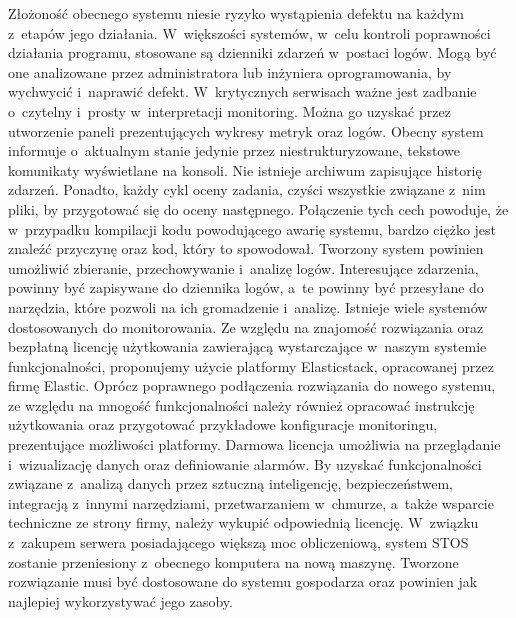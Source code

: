 \newline \indent Złożoność obecnego systemu niesie ryzyko wystąpienia defektu na każdym z~etapów jego działania. W~większości systemów, w~celu kontroli poprawności działania programu, stosowane są dzienniki zdarzeń w~postaci logów. Mogą być one analizowane przez administratora lub inżyniera oprogramowania, by wychwycić i~naprawić defekt. W~krytycznych serwisach ważne jest zadbanie o~czytelny i~prosty w~interpretacji monitoring. Można go uzyskać przez utworzenie paneli prezentujących wykresy metryk oraz logów. Obecny system informuje o~aktualnym stanie jedynie przez niestrukturyzowane, tekstowe komunikaty wyświetlane na konsoli. Nie istnieje archiwum zapisujące historię zdarzeń. Ponadto, każdy cykl oceny zadania, czyści wszystkie związane z~nim pliki, by przygotować się do oceny następnego. Połączenie tych cech powoduje, że w~przypadku kompilacji kodu powodującego awarię systemu, bardzo ciężko jest znaleźć przyczynę oraz kod, który to spowodował. Tworzony system powinien umożliwić zbieranie, przechowywanie i~analizę logów. Interesujące zdarzenia, powinny być zapisywane do dziennika logów, a~te powinny być przesyłane do narzędzia, które pozwoli na ich gromadzenie i~analizę. Istnieje wiele systemów dostosowanych do monitorowania. Ze względu na znajomość rozwiązania oraz bezpłatną licencję użytkowania zawierającą wystarczające w~naszym systemie funkcjonalności, proponujemy użycie platformy Elasticstack\cite{elastic}, opracowanej przez firmę Elastic. Oprócz poprawnego podłączenia rozwiązania do nowego systemu, ze względu na mnogość funkcjonalności należy również opracować instrukcję użytkowania oraz przygotować przykładowe konfiguracje monitoringu, prezentujące możliwości platformy. Darmowa licencja umożliwia na przeglądanie i~wizualizację danych oraz definiowanie alarmów. By uzyskać funkcjonalności związane z~analizą danych przez sztuczną inteligencję, bezpieczeństwem, integracją z~innymi narzędziami, przetwarzaniem w~chmurze, a~także wsparcie techniczne ze strony firmy, należy wykupić odpowiednią licencję\cite{elasticLicencje}.
\newline \indent W~związku z~zakupem serwera posiadającego większą moc obliczeniową, system STOS zostanie przeniesiony z~obecnego komputera na nową maszynę. Tworzone rozwiązanie musi być dostosowane do systemu gospodarza oraz powinien jak najlepiej wykorzystywać jego zasoby.

